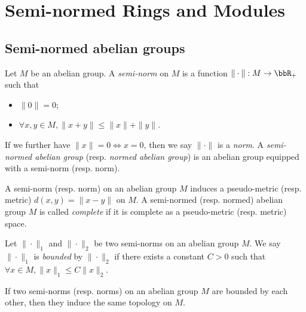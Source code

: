 \section{Semi-normed Rings and Modules}


\subsection{Semi-normed abelian groups}

    \begin{definition}\label{def:semi-normed_abelian_group}
        Let \(M\) be an abelian group.
        A \emph{semi-norm} on \(M\) is a function \(\|\cdot\|: M \to \bbR_+\) such that
        \begin{itemize}
            \item \(\|0\| = 0\);
            \item \(\forall x,y \in M, \|x + y\| \leq \|x\| + \|y\|\).
        \end{itemize}
        If we further have \(\|x\| = 0 \iff x = 0\), then we say \(\|\cdot\|\) is a \emph{norm}.
        A \emph{semi-normed abelian group} (resp. \emph{normed abelian group}) is an abelian group equipped with a semi-norm (resp. norm).
    \end{definition}

    \begin{definition}\label{def:complete_semi-normed_abelian_group}
        A semi-norm (resp. norm) on an abelian group \(M\) induces a pseudo-metric (resp. metric) \(d(x,y) = \|x - y\|\) on \(M\).
        A semi-normed (resp. normed) abelian group \(M\) is called \emph{complete} if it is complete as a pseudo-metric (resp. metric) space.
    \end{definition}

    \begin{definition}\label{def:bounded_semi-norm}
        Let \(\|\cdot\|_1\) and \(\|\cdot\|_2\) be two semi-norms on an abelian group \(M\).
        We say \(\|\cdot\|_1\) is \emph{bounded} by \(\|\cdot\|_2\) if there exists a constant \(C > 0\) such that \(\forall x \in M, \|x\|_1 \leq C\|x\|_2\).
    \end{definition}

    \begin{remark}\label{rmk:semi-norms_bounded_by_each_other_induces_the_same_topologies}
        If two semi-norms (resp. norms) on an abelian group \(M\) are bounded by each other, then they induce the same topology on \(M\).
    \end{remark}

